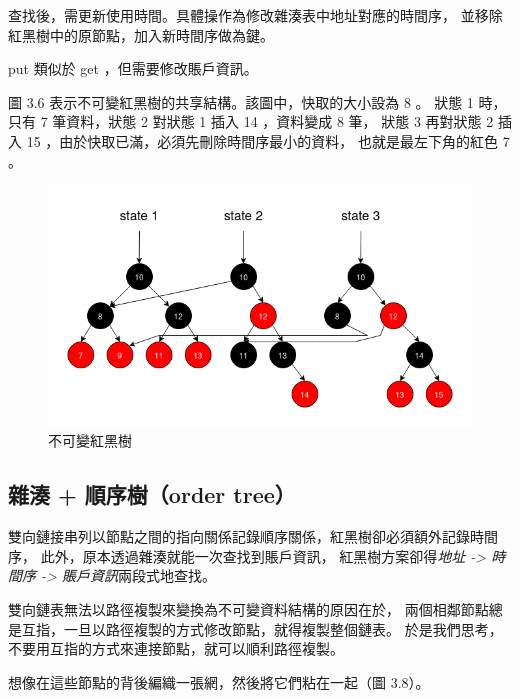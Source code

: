 查找後，需更新使用時間。具體操作為修改雜湊表中地址對應的時間序，
並移除紅黑樹中的原節點，加入新時間序做為鍵。

put 類似於 get ，但需要修改賬戶資訊。

圖 3.6 表示不可變紅黑樹的共享結構。該圖中，快取的大小設為 8 。
狀態 1 時，只有 7 筆資料，狀態 2 對狀態 1 插入 14 ，資料變成 8 筆，
狀態 3 再對狀態 2 插入 15 ，由於快取已滿，必須先刪除時間序最小的資料，
也就是最左下角的紅色 7 。

\begin{figure}[h!]
\includegraphics[width=\textwidth]{不可變紅黑樹}
\caption{不可變紅黑樹}
\end{figure}


\subsection{雜湊 + 順序樹（order tree）}

雙向鏈接串列以節點之間的指向關係記錄順序關係，紅黑樹卻必須額外記錄時間序，
此外，原本透過雜湊就能一次查找到賬戶資訊，
紅黑樹方案卻得\emph{地址 -> 時間序 -> 賬戶資訊}兩段式地查找。

雙向鏈表無法以路徑複製來變換為不可變資料結構的原因在於，
兩個相鄰節點總是互指，一旦以路徑複製的方式修改節點，就得複製整個鏈表。
於是我們思考，不要用互指的方式來連接節點，就可以順利路徑複製。

想像在這些節點的背後編織一張網，然後將它們粘在一起（圖 3.8）。

